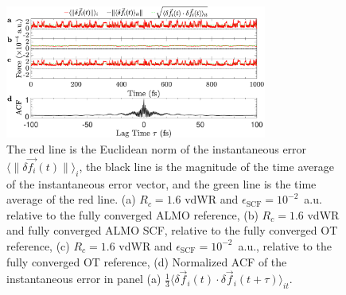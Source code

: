 \documentclass[aps,prl,reprint,amsmath,amssymb]{revtex4-1}
\begin{document}


\begin{figure}
\includegraphics[trim={0.5cm 0cm 0.7cm 0.1cm},clip,width=8.6cm]{DeltaForceComparison_with_ACF.eps}
\caption{\label{fig:randomforce}  
The red line is the Euclidean norm of the instantaneous error $\langle \| \delta \vec{f_{i}}(t) \| \rangle_{i}$, the black line is the magnitude of the time average of the instantaneous error vector, and the green line is the time average of the red line. 
(a) $R_{c} = 1.6$ vdWR and $\epsilon_{\text{SCF}} = 10^{-2}$~a.u. relative to the fully converged ALMO reference, 
(b) $R_{c} = 1.6$ vdWR and fully converged ALMO SCF, relative to the fully converged OT reference, 
(c) $R_{c} = 1.6$ vdWR and $\epsilon_{\text{SCF}} = 10^{-2}$~a.u., relative to the fully converged OT reference, 
(d) Normalized ACF of the instantaneous error in panel (a) $\frac{1}{3}\langle \delta \vec{f}_i (t) \cdot \delta\vec{f}_i(t+\tau) \rangle_{it} $.
}
\end{figure}

\end{document}
